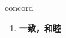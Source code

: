 
\begin{frame}
{\huge concord}
\begin{center}
\begin{enumerate}\Large
  \item \textbf{一致，和睦}
\end{enumerate}
\end{center}
\end{frame}
